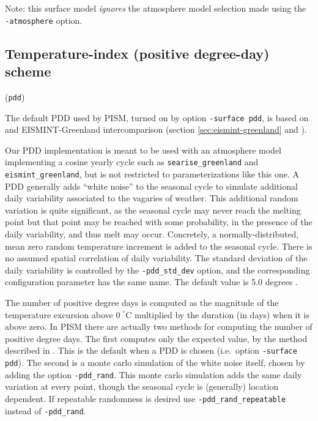 \documentclass[titlepage,letterpaper,final]{scrartcl}
\newcommand{\intextoption}[1]{\texttt{-#1}\optindex{\texttt{-#1}}}
\begin{document}
Note: this surface model \emph{ignores} the atmosphere model selection made using the \texttt{-atmosphere} option.

\subsection{Temperature-index (positive degree-day) scheme}
\label{sec:temp-index-posit}

(\texttt{pdd})     

The default PDD used by PISM, turned on by option \texttt{-surface pdd}, is
based on \cite{CalovGreve05} and EISMINT-Greenland intercomparison (section
\ref{sec:eismint-greenland} and \cite{RitzEISMINT}).

Our PDD implementation is meant to be used with an atmosphere model
implementing a cosine yearly cycle such as \texttt{searise_greenland} and
\texttt{eismint_greenland}, but is not restricted to parameterizations like
this one. A PDD generally adds ``white noise'' to the seasonal cycle to
simulate additional daily variability associated to the vagaries of weather.
This additional random variation is quite significant, as the seasonal cycle
may never reach the melting point but that point may be reached with some
probability, in the presence of the daily variability, and thus melt may occur.
Concretely, a normally-distributed, mean zero random temperature increment is
added to the seasonal cycle. There is no assumed spatial correlation of daily
variability. The standard deviation of the daily variability is controlled by
the \intextoption{pdd_std_dev} option, and the corresponding configuration
parameter has the same name. The default value is 5.0 degrees
\cite{RitzEISMINT}.

The number of positive degree days is computed as the magnitude of the
temperature excursion above $0\!\phantom{|}^\circ \text{C}$ multiplied by the
duration (in days) when it is above zero. In PISM there are actually two
methods for computing the number of positive degree days. The first computes
only the expected value, by the method described in \cite{CalovGreve05}. This
is the default when a PDD is chosen (i.e.~option \texttt{-surface pdd}). The
second is a monte carlo simulation of the white noise itself, chosen by adding
the option \intextoption{pdd_rand}. This monte carlo simulation adds the same
daily variation at every point, though the seasonal cycle is (generally)
location dependent. If repeatable randomness is desired use
\intextoption{pdd_rand_repeatable} instead of \texttt{-pdd_rand}.
\end{document}
